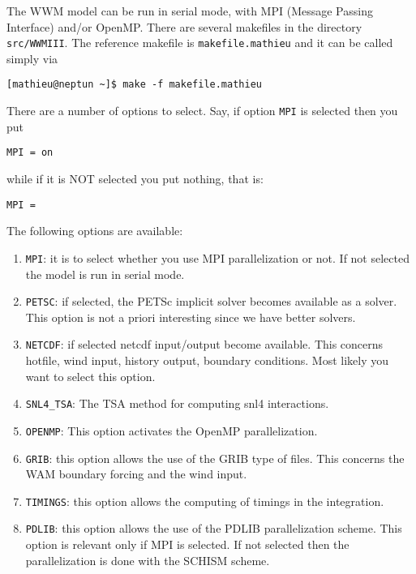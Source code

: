 \documentclass[12pt]{amsart}
\begin{document}
The WWM model can be run in serial mode, with MPI (Message Passing Interface) and/or OpenMP.
There are several makefiles in the directory {\tt src/WWMIII}. The reference makefile is
{\tt makefile.mathieu} and it can be called simply via
\begin{verbatim}
[mathieu@neptun ~]$ make -f makefile.mathieu
\end{verbatim}

There are a number of options to select. Say, if option {\tt MPI} is selected then you put
\begin{verbatim}
MPI = on
\end{verbatim}
while if it is NOT selected you put nothing, that is:
\begin{verbatim}
MPI =
\end{verbatim}
The following options are available:
\begin{enumerate}
\item {\tt MPI}: it is to select whether you use MPI parallelization or not. If not selected the model is run in serial mode.
\item {\tt PETSC}: if selected, the PETSc implicit solver becomes available as a solver. This option is not a priori interesting since we have better solvers.
\item {\tt NETCDF}: if selected netcdf input/output become available. This concerns hotfile, wind input, history output, boundary conditions. Most likely you want to select this option.
\item {\tt SNL4\_TSA}: The TSA method for computing snl4 interactions.
\item {\tt OPENMP}: This option activates the OpenMP parallelization.
\item {\tt GRIB}: this option allows the use of the GRIB type of files. This concerns the WAM boundary forcing and the wind input.
\item {\tt TIMINGS}: this option allows the computing of timings in the integration.
\item {\tt PDLIB}: this option allows the use of the PDLIB parallelization scheme. This option is relevant only if MPI is selected. If not selected then the parallelization is done with the SCHISM scheme.
\end{enumerate}
\end{document}
